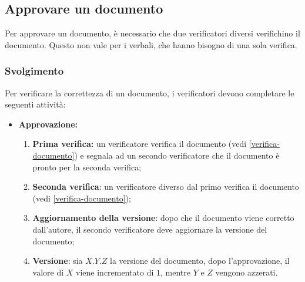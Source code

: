 \subsection{Approvare un documento}
\label{approvazione-documento}

Per approvare un documento, è necessario che due verificatori diversi
verifichino il documento. Questo non vale per i verbali, che hanno bisogno di
una sola verifica.

\subsubsection{Svolgimento}

Per verificare la correttezza di un documento, i verificatori devono
completare le seguenti attività:
\begin{itemize}
	\item \textbf{Approvazione:}
	      \begin{enumerate}
		      \item \textbf{Prima verifica:} un verificatore verifica il
		            documento (vedi \autoref{verifica-documento}) e segnala ad
		            un secondo verificatore che il documento è pronto per la
		            seconda verifica;

		      \item \textbf{Seconda verifica}: un verificatore diverso dal primo
		            verifica il documento (vedi \autoref{verifica-documento});

		      \item \textbf{Aggiornamento della versione}: dopo che il documento
		            viene corretto dall'autore, il secondo verificatore deve
		            aggiornare la versione del documento;

		      \item \textbf{Versione}: sia $X.Y.Z$ la versione del documento,
		            dopo l'approvazione, il valore di $X$ viene incrementato di
		            $1$, mentre $Y$ e $Z$ vengono azzerati.
	      \end{enumerate}
\end{itemize}
